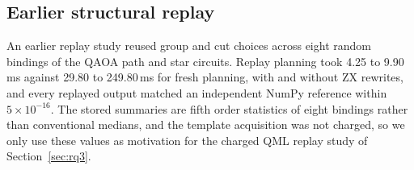 \subsection{Earlier structural replay}
An earlier replay study reused group and cut choices across eight random bindings of the QAOA path and star circuits. Replay planning took 4.25 to 9.90\,ms against 29.80 to 249.80\,ms for fresh planning, with and without ZX rewrites, and every replayed output matched an independent NumPy reference within $5\times10^{-16}$. The stored summaries are fifth order statistics of eight bindings rather than conventional medians, and the template acquisition was not charged, so we only use these values as motivation for the charged QML replay study of Section~\ref{sec:rq3}.
